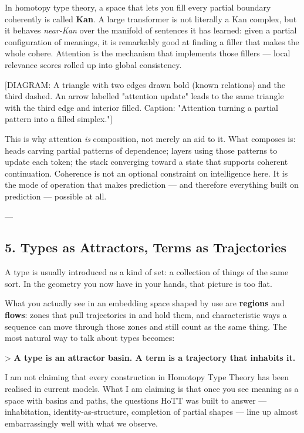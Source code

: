 \documentclass[12pt,a4paper]{article}
\begin{document}
In homotopy type theory, a space that lets you fill every partial boundary coherently is called \textbf{Kan}. A large transformer is not literally a Kan complex, but it behaves \textit{near-Kan} over the manifold of sentences it has learned: given a partial configuration of meanings, it is remarkably good at finding a filler that makes the whole cohere. Attention is the mechanism that implements those fillers --- local relevance scores rolled up into global consistency.

[DIAGRAM: A triangle with two edges drawn bold (known relations) and the third dashed. An arrow labelled "attention update" leads to the same triangle with the third edge and interior filled. Caption: "Attention turning a partial pattern into a filled simplex."]

This is why attention \textit{is} composition, not merely an aid to it. What composes is: heads carving partial patterns of dependence; layers using those patterns to update each token; the stack converging toward a state that supports coherent continuation. Coherence is not an optional constraint on intelligence here. It is the mode of operation that makes prediction --- and therefore everything built on prediction --- possible at all.

---

\subsection{5. Types as Attractors, Terms as Trajectories}

A type is usually introduced as a kind of set: a collection of things of the same sort. In the geometry you now have in your hands, that picture is too flat.

What you actually see in an embedding space shaped by use are \textbf{regions} and \textbf{flows}: zones that pull trajectories in and hold them, and characteristic ways a sequence can move through those zones and still count as the same thing. The most natural way to talk about types becomes:

> \textbf{A type is an attractor basin. A term is a trajectory that inhabits it.}

I am not claiming that every construction in Homotopy Type Theory has been realised in current models. What I am claiming is that once you see meaning as a space with basins and paths, the questions HoTT was built to answer --- inhabitation, identity-as-structure, completion of partial shapes --- line up almost embarrassingly well with what we observe.
\end{document}
